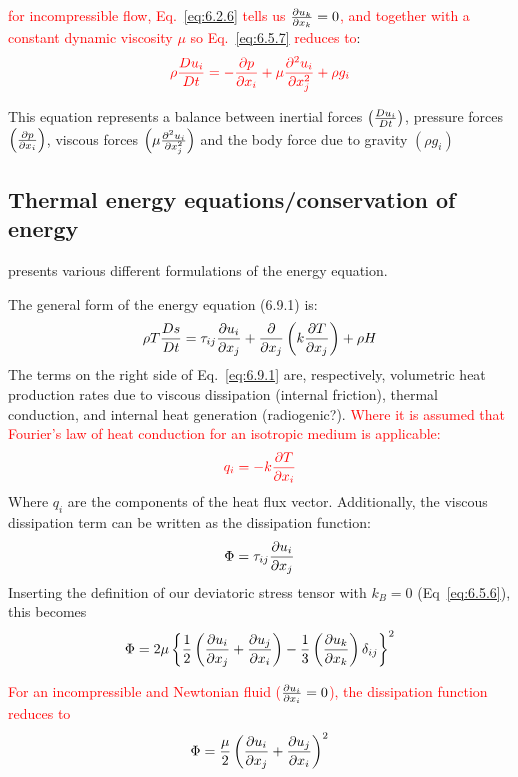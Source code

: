 \documentclass[document.tex]{subfiles}
\begin{document}
\textcolor{red}{for incompressible flow, Eq.~\eqref{eq:6.2.6} tells us $\pdv{u_k}{x_k} =0$, 
and together with a constant dynamic viscosity $\mu$ so Eq.~\eqref{eq:6.5.7} reduces to}: 
\begin{align} \label{eq:6.5.9}
    \color{red}
    \rho \frac{D u_i}{D t} = - \pdv{p}{x_i} + \mu \pdv[2]{u_i}{x_j} + \rho g_i
\end{align}

This equation represents a balance between inertial forces $\left(\frac{D u_i}{D t}\right)$, pressure 
forces $\left(\pdv{p}{x_i}\right)$, viscous forces $\left(\mu \pdv[2]{u_i}{x_j}\right)$ 
and the body force due to gravity $\left(\rho g_i\right)$

\subsection{Thermal energy equations/conservation of energy}
\cite{scto01} presents various different formulations of the energy equation.

The general form of the energy equation (6.9.1) is:
\begin{equation} \label{eq:6.9.1}
    \rho T \frac{D s}{D t} = \tau_{ij}\pdv{u_i}{x_j} + \pdv{}{x_j}\left(k\pdv{T}{x_j}\right) + \rho H 
\end{equation}
The terms on the right side of Eq.~\eqref{eq:6.9.1} are, respectively, volumetric heat production rates due 
to viscous dissipation (internal friction), thermal conduction, and internal heat generation (radiogenic?). 
\textcolor{red}{Where it is assumed that Fourier's law of heat conduction for an isotropic medium is applicable:}
\begin{align}
    \color{red}
    q_i = -k \pdv{T}{x_i}
\end{align}
Where $q_i$ are the components of the heat flux vector. Additionally, the viscous dissipation term can be written 
as the dissipation function: 
\begin{align} \label{dissipation function}
    \Phi = \tau_{ij} \pdv{u_i}{x_j}
\end{align}
Inserting the definition of our deviatoric stress tensor with $k_B = 0$ (Eq~\eqref{eq:6.5.6}), this becomes
\begin{align} \label{6.9.4}
    \Phi = 2\mu \left\{\frac{1}{2}\left(\pdv{u_i}{x_j} + \pdv{u_j}{x_i}\right)
    - \frac{1}{3}\left(\pdv{u_k}{x_k}\right)\delta_{ij}\right\}^2
\end{align}

\textcolor{red}{For an incompressible and Newtonian fluid ($\pdv{u_i}{x_i} = 0$), the dissipation function reduces to}
{\color{red}
\begin{align}
    \Phi = \frac{\mu}{2}\left(\pdv{u_i}{x_j} + \pdv{u_j}{x_i}\right)^2
\end{align}
}
\end{document}
